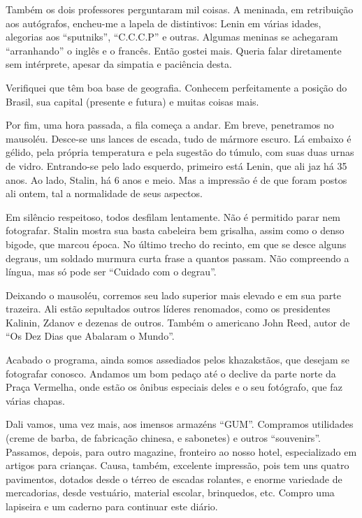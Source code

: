 Também os dois professores perguntaram mil coisas. A meninada, em retribuição aos autógrafos, encheu-me a lapela de distintivos: Lenin em várias idades, alegorias aos ``sputniks'', ``C.C.C.P'' e outras. Algumas meninas se achegaram ``arranhando'' o inglês e o francês. Então gostei mais. Queria falar diretamente sem intérprete, apesar da simpatia e paciência desta.

Verifiquei que têm boa base de geografia. Conhecem perfeitamente a posição do Brasil, sua capital (presente e futura) e muitas coisas mais.

Por fim, uma hora passada, a fila começa a andar. Em breve, penetramos no mausoléu. Desce-se uns lances de escada, tudo de mármore escuro. Lá embaixo é gélido, pela própria temperatura e pela sugestão do túmulo, com suas duas urnas de vidro. Entrando-se pelo lado esquerdo, primeiro está Lenin, que ali jaz há 35 anos. Ao lado, Stalin, há 6 anos e meio. Mas a impressão é de que foram postos ali ontem, tal a normalidade de seus aspectos.

Em silêncio respeitoso, todos desfilam lentamente. Não é permitido parar nem fotografar. Stalin mostra sua basta cabeleira bem grisalha, assim como o denso bigode, que marcou época. No último trecho do recinto, em que se desce alguns degraus, um soldado murmura curta frase a quantos passam. Não compreendo a língua, mas só pode ser ``Cuidado com o degrau''.

Deixando o mausoléu, corremos seu lado superior mais elevado e em sua parte trazeira. Ali estão sepultados outros líderes renomados, como os presidentes Kalinin, Zdanov e dezenas de outros. Também o americano John Reed, autor de ``Os Dez Dias que Abalaram o Mundo''.

Acabado o programa, ainda somos assediados pelos khazakstãos, que desejam se fotografar conosco. Andamos um bom pedaço até o declive da parte norte da Praça Vermelha, onde estão os ônibus especiais deles e o seu fotógrafo, que faz várias chapas.

Dali vamos, uma vez mais, aos imensos armazéns ``GUM''. Compramos utilidades (creme de barba, de fabricação chinesa, e sabonetes) e outros ``souvenirs''. Passamos, depois, para outro magazine, fronteiro ao nosso hotel, especializado em artigos para crianças. Causa, também, excelente impressão, pois tem uns quatro pavimentos, dotados desde o térreo de escadas rolantes, e enorme variedade de mercadorias, desde vestuário, material escolar, brinquedos, etc. Compro uma lapiseira e um caderno para continuar este diário.

